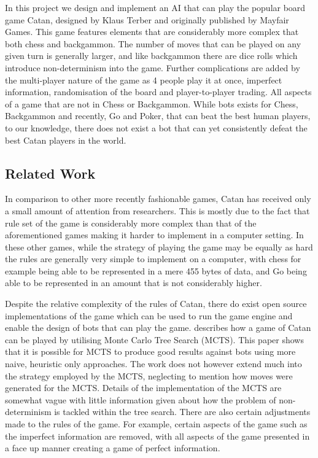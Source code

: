 \documentclass[]{article}
\begin{document}
\par In this project we design and implement an AI that can play the popular board game Catan, designed by Klaus Terber and originally published by Mayfair Games. This game features elements that are considerably more complex that both chess and backgammon. The number of moves that can be played on any given turn is generally larger, and like backgammon there are dice rolls which introduce non-determinism into the game. Further complications are added by the multi-player nature of the game as 4 people play it at once, imperfect information, randomisation of the board and player-to-player trading. All aspects of a game that are not in Chess or Backgammon. While bots exists for Chess, Backgammon and recently, Go and Poker, that can beat the best human players, to our knowledge, there does not exist a bot that can yet consistently defeat the best Catan players in the world.
 
\subsection{Related Work}
In comparison to other more recently fashionable games, Catan has received only a small amount of attention from researchers. This is mostly due to the fact that rule set of the game is considerably more complex than that of the aforementioned games making it harder to implement in a computer setting. In these other games, while the strategy of playing the game may be equally as hard the rules are generally very simple to implement on a computer, with chess for example being able to be represented in a mere 455 bytes of data, and Go being able to be represented in an amount that is not considerably higher.

\par Despite the relative complexity of the rules of Catan, there do exist open source implementations of the game which can be used to run the game engine and enable the design of bots that can play the game. \textcite{szita2009monte} describes how a game of Catan can be played by utilising Monte Carlo Tree Search (MCTS). This paper shows that it is possible for MCTS to produce good results against bots using more naive, heuristic only approaches. The work does not however  extend much into the strategy employed by the MCTS, neglecting to mention how moves were generated for the MCTS. Details of the implementation of the MCTS are somewhat vague with little information given about how the problem of non-determinism is tackled within the tree search. There are also certain adjustments made to the rules of the game. For example, certain aspects of the game such as the imperfect information are removed, with all aspects of the game presented in a face up manner creating a game of perfect information.
\end{document}
